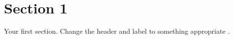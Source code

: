 \section{Section 1}
\label{sec:sec1}

Your first section. Change the header and label to something appropriate \cite{FengB16,KuneKARB16,BeloglazovB15,GomesCT15}.

